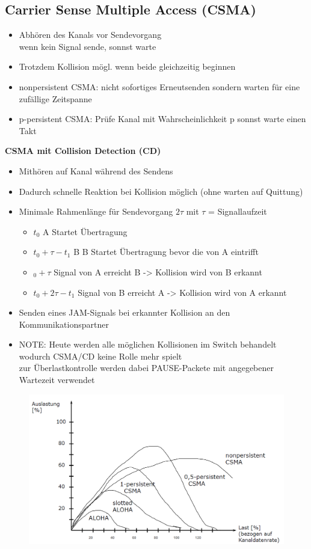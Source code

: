 \documentclass[12pt,a4paper]{article}
\begin{document}
\subsection{Carrier Sense Multiple Access (CSMA)}
\begin{itemize}
\item Abhören des Kanals vor Sendevorgang\\
wenn kein Signal sende, sonnst warte
\item Trotzdem Kollision mögl. wenn beide gleichzeitig beginnen
\item nonpersistent CSMA: nicht sofortiges Erneutsenden sondern warten für eine zufällige Zeitspanne
\item p-persistent CSMA: Prüfe Kanal mit Wahrscheinlichkeit p sonnst warte einen Takt
\end{itemize}
\textbf{CSMA mit Collision Detection (CD)}
\begin{itemize}
\item Mithören auf Kanal während des Sendens
\item Dadurch schnelle Reaktion bei Kollision möglich (ohne warten auf Quittung)
\item Minimale Rahmenlänge für Sendevorgang $2 \tau$ mit $\tau$ = Signallaufzeit
\begin{itemize}
\item $t_0$ A Startet Übertragung
\item $t_0 + \tau - t_1$ B B Startet Übertragung bevor die von A eintrifft
\item $_0 + \tau$ Signal von A erreicht B -> Kollision wird von B erkannt
\item $t_0 + 2 \tau - t_1$ Signal von B erreicht A -> Kollision wird von A erkannt
\end{itemize}
\item Senden eines JAM-Signals bei erkannter Kollision an den Kommunikationspartner
\item NOTE: Heute werden alle möglichen Kollisionen im Switch behandelt wodurch CSMA/CD keine Rolle mehr spielt\\
zur Überlastkontrolle werden dabei PAUSE-Packete mit angegebener Wartezeit verwendet
\end{itemize}

\begin{figure}[H]
\includegraphics[scale=0.35]{./resources/durchsatz.png}
\end{figure}
\end{document}
